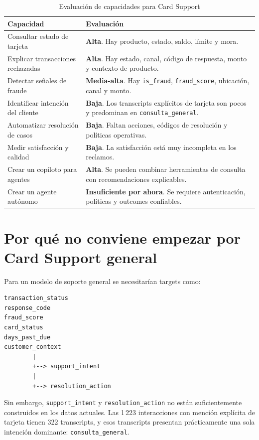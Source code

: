 \documentclass[11pt,a4paper]{article}
\begin{document}
\begin{table}[ht]
\centering
\small
\caption{Evaluación de capacidades para Card Support}
\begin{tabularx}{\textwidth}{>{\raggedright\arraybackslash}p{} X}
\toprule
Capacidad & Evaluación \\
\midrule
Consultar estado de tarjeta & \textbf{Alta}. Hay producto, estado, saldo, límite y mora. \\
Explicar transacciones rechazadas & \textbf{Alta}. Hay estado, canal, código de respuesta, monto y contexto de producto. \\
Detectar señales de fraude & \textbf{Media-alta}. Hay \texttt{is\_fraud}, \texttt{fraud\_score}, ubicación, canal y monto. \\
Identificar intención del cliente & \textbf{Baja}. Los transcripts explícitos de tarjeta son pocos y predominan en \texttt{consulta\_general}. \\
Automatizar resolución de casos & \textbf{Baja}. Faltan acciones, códigos de resolución y políticas operativas. \\
Medir satisfacción y calidad & \textbf{Baja}. La satisfacción está muy incompleta en los reclamos. \\
Crear un copiloto para agentes & \textbf{Alta}. Se pueden combinar herramientas de consulta con recomendaciones explicables. \\
Crear un agente autónomo & \textbf{Insuficiente por ahora}. Se requiere autenticación, políticas y outcomes confiables. \\
\bottomrule
\end{tabularx}
\end{table}

\section{Por qué no conviene empezar por Card Support general}

Para un modelo de soporte general se necesitarían targets como:

\begin{lstlisting}
transaction_status
response_code
fraud_score
card_status
days_past_due
customer_context
        |
        +--> support_intent
        |
        +--> resolution_action
\end{lstlisting}

Sin embargo, \texttt{support\_intent} y \texttt{resolution\_action} no están suficientemente construidos en los datos actuales. Las 1\,223 interacciones con mención explícita de tarjeta tienen 322 transcripts, y esos transcripts presentan prácticamente una sola intención dominante: \texttt{consulta\_general}.
\end{document}
